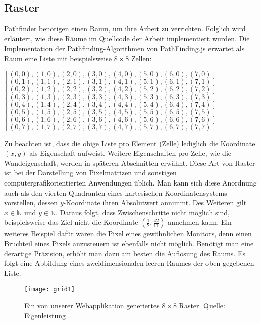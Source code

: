 \subsection{Raster}
Pathfinder benötigen einen Raum, um ihre Arbeit zu verrichten. Folglich wird erläutert, wie diese Räume im Quellcode der Arbeit implementiert wurden.
Die Implementation der Pathfinding-Algorithmen von PathFinding.js erwartet als Raum eine Liste mit beispielsweise $8\times8$ Zellen: \\
\begin{center}
$[(0,0),(1,0),(2,0),(3,0),(4,0),(5,0),(6,0),(7,0)]$\\
$[(0,1),(1,1),(2,1),(3,1),(4,1),(5,1),(6,1),(7,1)]$\\
$[(0,2),(1,2),(2,2),(3,2),(4,2),(5,2),(6,2),(7,2)]$\\
$[(0,3),(1,3),(2,3),(3,3),(4,3),(5,3),(6,3),(7,3)]$\\
$[(0,4),(1,4),(2,4),(3,4),(4,4),(5,4),(6,4),(7,4)]$\\
$[(0,5),(1,5),(2,5),(3,5),(4,5),(5,5),(6,5),(7,5)]$\\
$[(0,6),(1,6),(2,6),(3,6),(4,6),(5,6),(6,6),(7,6)]$\\
$[(0,7),(1,7),(2,7),(3,7),(4,7),(5,7),(6,7),(7,7)]$
\end{center}
Zu beachten ist, dass die obige Liste pro Element (Zelle) lediglich die Koordinate $(x,y)$ als Eigenschaft aufweist. Weitere Eigenschaften pro Zelle, wie die Wandeigenschaft, werden in späteren Abschnitten erwähnt.
Diese Art von Raster ist bei der Darstellung von Pixelmatrizen und sonstigen computergrafikorientierten Anwendungen üblich. 
Man kann sich diese Anordnung auch als den vierten Quadranten eines kartesischen Koordinatensystems vorstellen, dessen $y$-Koordinate ihren Absolutwert annimmt. 
Des Weiteren gilt $x \in \mathbb{N}$ und $y \in \mathbb{N}$. 
Daraus folgt, dass Zwischenschritte nicht möglich sind, beispielsweise das Ziel nicht die Koordinate $(\frac{1}{2},\frac{42}{11})$ annehmen kann. Ein weiteres Beispiel dafür wären die Pixel eines gewöhnlichen Monitors, denn einen Bruchteil eines Pixels anzusteuern ist ebenfalls nicht möglich.
Benötigt man eine derartige Präzision, erhöht man dazu am besten die Auflösung des Raums. Es folgt eine Abbildung eines zweidimensionalen leeren Raumes der oben gegebenen Liste.
\begin{figure}[H]
  \centering
  \texttt{[image: grid1]}
  \caption[Ein von unserer Webapplikation generiertes $8\times8$ Raster.]{Ein von unserer Webapplikation generiertes $8\times8$ Raster. Quelle: Eigenleistung}
  \label{fig:grid1}
\end{figure}

